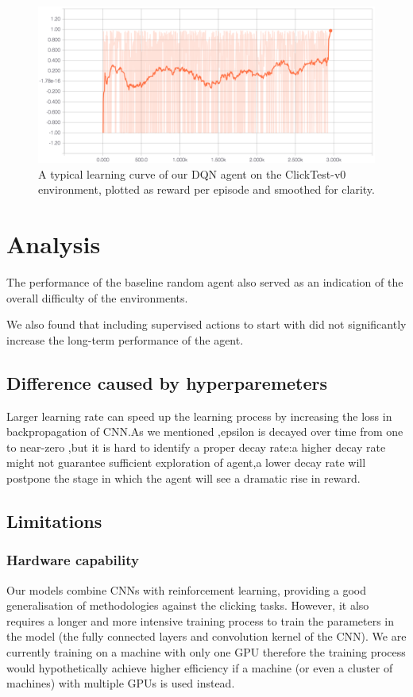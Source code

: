 \documentclass[10pt,journal,compsoc]{IEEEtran}
\begin{document}
\begin{figure}[h!]
\centering
	\includegraphics[width=\columnwidth, keepaspectratio]{learningcurve.png}
	\caption{A typical learning curve of our DQN agent on the ClickTest-v0 environment, plotted as reward per episode and smoothed for clarity.}
	\label{fig:tboard}
\end{figure}




\section{Analysis}
The performance of the baseline random agent also served as an indication of the overall difficulty of the environments.

We also found that including supervised actions to start with did not significantly increase the long-term performance of the agent.

\subsection{Difference caused by hyperparemeters}
Larger learning rate can speed up the learning process by increasing the loss in backpropagation of CNN.As we mentioned ,epsilon is decayed over time from one to near-zero ,but it is hard to identify a proper decay rate:a higher decay rate might not guarantee sufficient exploration of agent,a lower decay rate will postpone the stage in which  the agent will see a dramatic rise in reward. 
\subsection{Limitations}

\subsubsection{Hardware capability}
Our models combine CNNs with reinforcement learning, providing a good generalisation of methodologies against the clicking tasks. However, it also requires a longer and more intensive training process to train the parameters in the model (the fully connected layers and convolution kernel of the CNN). We are currently training on a machine with only one GPU therefore the training process would hypothetically achieve higher efficiency if a machine (or even a cluster of machines) with multiple GPUs is used instead.
\end{document}
